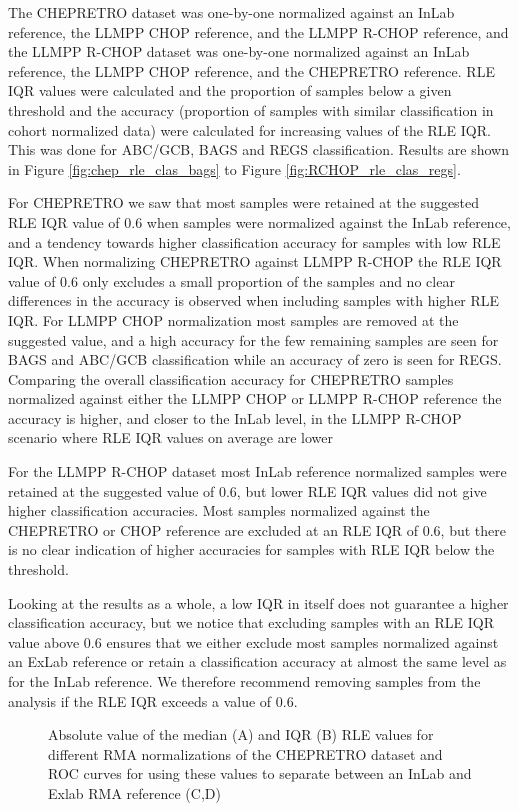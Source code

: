 \documentclass{article}
\begin{document}
The CHEPRETRO dataset was one-by-one normalized against an InLab reference, the LLMPP CHOP reference, and the LLMPP R-CHOP reference, and the LLMPP R-CHOP dataset was one-by-one normalized against an InLab reference, the LLMPP CHOP reference, and the CHEPRETRO reference. RLE IQR values were calculated and the proportion of samples below a given threshold and the accuracy (proportion of samples with similar classification in cohort normalized data) were calculated for increasing values of the RLE IQR. This was done for ABC/GCB, BAGS and REGS classification. Results are shown in Figure \ref{fig:chep_rle_clas_bags} to Figure \ref{fig:RCHOP_rle_clas_regs}. 

For CHEPRETRO we saw that most samples were retained at the suggested RLE IQR value of 0.6 when samples were normalized against the InLab reference, and a tendency towards higher classification accuracy for samples with low RLE IQR. When normalizing CHEPRETRO against LLMPP R-CHOP the RLE IQR value of 0.6 only excludes a small proportion of the samples and no clear differences in the accuracy is observed when including samples with higher RLE IQR. For LLMPP CHOP normalization most samples are removed at the suggested value, and a high accuracy for the few remaining samples are seen for BAGS and ABC/GCB classification while an accuracy of zero is seen for REGS. Comparing the overall classification accuracy for CHEPRETRO samples normalized against either the LLMPP CHOP or LLMPP R-CHOP reference the accuracy is higher, and closer to the InLab level, in the LLMPP R-CHOP scenario where RLE IQR values on average are lower

For the LLMPP R-CHOP dataset most InLab reference normalized samples were retained at the suggested value of 0.6, but lower RLE IQR values did not give higher classification accuracies. Most samples normalized against the CHEPRETRO or CHOP reference are excluded at an RLE IQR of 0.6, but there is no clear indication of higher accuracies for samples with RLE IQR below the threshold.

Looking at the results as a whole, a low IQR in itself does not guarantee a higher classification accuracy, but we notice that excluding samples with an RLE IQR value above 0.6 ensures that we either exclude most samples normalized against an ExLab reference or retain a classification accuracy at almost the same level as for the InLab reference. We therefore recommend removing samples from the analysis if the RLE IQR exceeds a value of 0.6.

\begin{figure}[!h]
	\begin{center}
	\end{center}
	\caption{Absolute value of the median (A) and IQR (B) RLE values for different RMA normalizations of the CHEPRETRO dataset and ROC curves for using these values to separate between an InLab and Exlab RMA reference (C,D)}
	\label{fig:chep_rle}
\end{figure}
\end{document}
